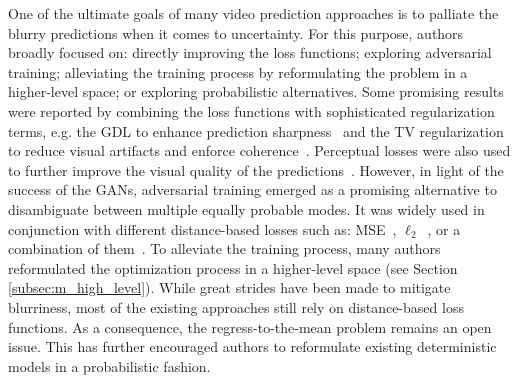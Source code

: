 One of the ultimate goals of many video prediction approaches is to palliate the blurry predictions when it comes to uncertainty. For this purpose, authors broadly focused on: directly improving the loss functions; exploring adversarial training; alleviating the training process by reformulating the problem in a higher-level space; or exploring probabilistic alternatives. Some promising results were reported by combining the loss functions with sophisticated regularization terms, e.g. the \ac{GDL} to enhance prediction sharpness~\cite{Mathieu2016} and the \ac{TV} regularization to reduce visual artifacts and enforce coherence~\cite{Liu2017}. Perceptual losses were also used to further improve the visual quality of the predictions~\cite{Dosovitskiy2016,Johnson2016,Ledig2017,Sajjadi2017,Zhu2016}. However, in light of the success of the \acp{GAN}, adversarial training emerged as a promising alternative to disambiguate between multiple equally probable modes. It was widely used in conjunction with different distance-based losses such as: \ac{MSE}~\cite{Lotter2015}, $\ell_2$~\cite{Chen2017,Jin2017,Wichers2018}, or a combination of them~\cite{Mathieu2016,Villegas2017,Walker2017,Liang2017,Luc2017,Hu2019}. To alleviate the training process, many authors reformulated the optimization process in a higher-level space (see Section \ref{subsec:m_high_level}). While great strides have been made to mitigate blurriness, most of the existing approaches still rely on distance-based loss functions. As a consequence, the regress-to-the-mean problem remains an open issue. This has further encouraged authors to reformulate existing deterministic models in a probabilistic fashion.

